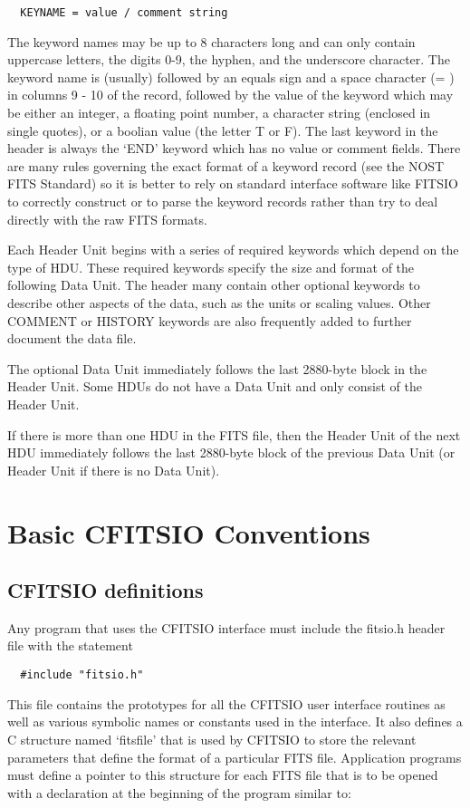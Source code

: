 \begin{verbatim}
  KEYNAME = value / comment string
\end{verbatim}
The keyword names may be up to 8 characters long and can only contain
uppercase letters, the digits 0-9, the hyphen, and the underscore
character. The keyword name is (usually) followed by an equals sign and
a space character (= ) in columns 9 - 10 of the record, followed by the
value of the keyword which may be either an integer, a floating point
number, a character string (enclosed in single quotes), or a boolian
value (the letter T or F). The last keyword in the header is always the
`END' keyword which has no value or comment fields. There are many
rules governing the exact format of a keyword record (see the NOST FITS
Standard) so it is better to rely on standard interface software like
FITSIO to correctly construct or to parse the keyword records rather
than try to deal directly with the raw FITS formats.

Each Header Unit begins with a series of required keywords which depend
on the type of HDU.  These required keywords specify the size and
format of the following Data Unit.  The header many contain other
optional keywords to describe other aspects of the data, such as the
units or scaling values.  Other COMMENT or HISTORY keywords are also
frequently added to further document the data file.

The optional Data Unit immediately follows the last 2880-byte block in
the Header Unit.  Some HDUs do not have a Data Unit and only consist of
the Header Unit.

If there is more than one HDU in the FITS file, then the Header Unit of
the next HDU immediately follows the last 2880-byte block of the
previous Data Unit (or Header Unit if there is no Data Unit).


\chapter{  Basic CFITSIO Conventions }


\section{CFITSIO definitions}

Any program that uses the CFITSIO interface must include the fitsio.h
header file with the statement

\begin{verbatim}
  #include "fitsio.h"
\end{verbatim}
This file contains the prototypes for
all the CFITSIO user interface routines as well as various symbolic
names or constants used in the interface.  It also defines a C
structure named `fitsfile' that is used by CFITSIO to store the
relevant parameters that define the format of a particular FITS file.
Application programs must define a pointer to this structure for each
FITS file that is to be opened with a declaration
at the beginning of the program similar to:

